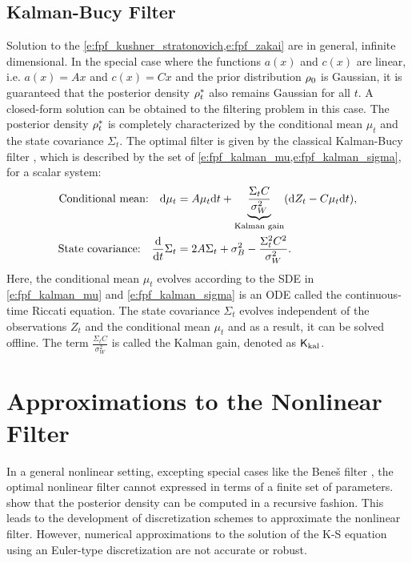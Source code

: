 \subsection{Kalman-Bucy Filter}
Solution to the \cref{e:fpf_kushner_stratonovich,e:fpf_zakai} are in general, infinite dimensional. In the special case where the functions $a(x)$ and $c(x)$ are linear, i.e. $a(x) = Ax$ and $c(x) = Cx$ and the prior distribution $\rho_0$ is Gaussian, it is guaranteed that the posterior density $\rho^*_t$ also remains Gaussian for all $t$. A closed-form solution can be obtained to the filtering problem in this case. The posterior density $\rho^*_t$ is completely characterized by the conditional mean $\mu_t$ and the state covariance $\Sigma_t$. The optimal filter is given by the classical Kalman-Bucy filter \cite{kal64}, which is described by the set of \cref{e:fpf_kalman_mu,e:fpf_kalman_sigma}, for a scalar system:
\begin{align}
\text{Conditional mean:} \quad \ud \mu_t & = A \mu_t \ud t + \underbrace{\frac{\Sigma_t C}{\sigma^2_W}}_{\text{Kalman gain}} ( \ud Z_t - C \mu_t \ud t), 
\label{e:fpf_kalman_mu} \\
\text{State covariance:}  \quad  \frac{\ud}{\ud t} \Sigma_t &= 2 A \Sigma_t + \sigma^2_B - \frac{\Sigma^2_t C^2}{\sigma^2_W}. 
\label{e:fpf_kalman_sigma}
\end{align}
Here, the conditional mean $\mu_t$ evolves according to the SDE in \eqref{e:fpf_kalman_mu} and \eqref{e:fpf_kalman_sigma} is an ODE called the continuous-time Riccati equation. The state covariance $\Sigma_t$ evolves independent of the observations $Z_t$ and the conditional mean $\mu_t$ and as a result, it can be solved offline.  
The term $\frac{\Sigma_t C}{\sigma^2_W}$ is called the Kalman gain, denoted as $\sf K_{\text{kal}}$. 
\section{Approximations to the Nonlinear Filter}
\label{s:approx_nl_filter}
In a general nonlinear setting, excepting special cases like the Bene\v{s} filter \cite{ben81}, the optimal nonlinear filter cannot expressed in terms of a finite set of parameters.  show that the posterior density can be computed in a recursive fashion. This leads to the development of discretization schemes to approximate the nonlinear filter. However, numerical approximations to the solution of the K-S equation using an Euler-type discretization are not accurate or robust. 

